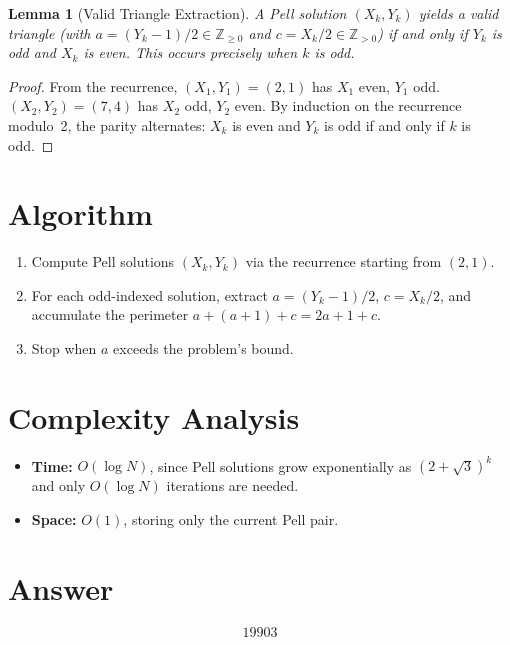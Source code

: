 \documentclass[12pt]{article}
\newtheorem{lemma}[theorem]{Lemma}
\begin{document}
\begin{lemma}[Valid Triangle Extraction]
A Pell solution $(X_k, Y_k)$ yields a valid triangle (with $a = (Y_k-1)/2 \in \mathbb{Z}_{\geq 0}$ and $c = X_k/2 \in \mathbb{Z}_{>0}$) if and only if $Y_k$ is odd and $X_k$ is even. This occurs precisely when $k$ is odd.
\end{lemma}

\begin{proof}
From the recurrence, $(X_1, Y_1) = (2, 1)$ has $X_1$ even, $Y_1$ odd. $(X_2, Y_2) = (7, 4)$ has $X_2$ odd, $Y_2$ even. By induction on the recurrence modulo~2, the parity alternates: $X_k$ is even and $Y_k$ is odd if and only if $k$ is odd.
\end{proof}

\section{Algorithm}

\begin{enumerate}
    \item Compute Pell solutions $(X_k, Y_k)$ via the recurrence starting from $(2, 1)$.
    \item For each odd-indexed solution, extract $a = (Y_k - 1)/2$, $c = X_k / 2$, and accumulate the perimeter $a + (a+1) + c = 2a + 1 + c$.
    \item Stop when $a$ exceeds the problem's bound.
\end{enumerate}

\section{Complexity Analysis}

\begin{itemize}
    \item \textbf{Time:} $O(\log N)$, since Pell solutions grow exponentially as $(2+\sqrt{3})^k$ and only $O(\log N)$ iterations are needed.
    \item \textbf{Space:} $O(1)$, storing only the current Pell pair.
\end{itemize}

\section{Answer}

\[
\boxed{19903}
\]
\end{document}
